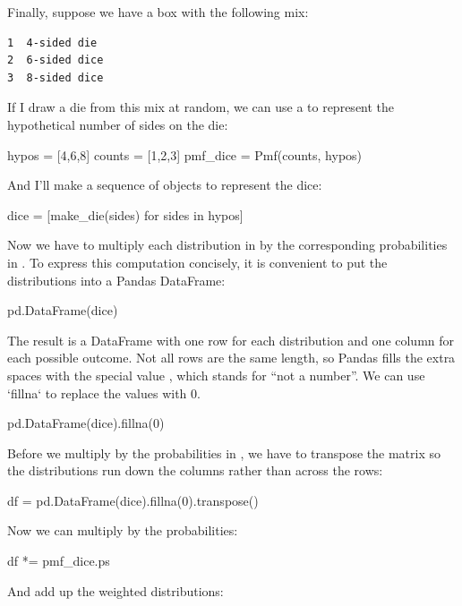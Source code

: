 \documentclass[12pt]{book}
\theoremstyle{exercise}
\begin{document}
Finally, suppose we have a box with the following mix:

\begin{verbatim}
1  4-sided die
2  6-sided dice
3  8-sided dice
\end{verbatim}

If I draw a die from this mix at random, we can use a  to represent the hypothetical number of sides on the die:

\begin{code}
hypos = [4,6,8]
counts = [1,2,3]
pmf_dice = Pmf(counts, hypos)
\end{code}

And I'll make a sequence of  objects to represent the dice:

\begin{code}
dice = [make_die(sides) for sides in hypos]
\end{code}

Now we have to multiply each distribution in  by the corresponding probabilities in .
To express this computation concisely, it is convenient to put the distributions into a Pandas DataFrame:

\begin{code}
pd.DataFrame(dice)
\end{code}

The result is a DataFrame with one row for each distribution and one column for each possible outcome.
Not all rows are the same length, so Pandas fills the extra spaces with the special value , which stands for ``not a number''.
We can use `fillna` to replace the  values with 0.

\begin{code}
pd.DataFrame(dice).fillna(0)
\end{code}

Before we multiply by the probabilities in , we have to transpose the matrix so the distributions run down the columns rather than across the rows:

\begin{code}
df = pd.DataFrame(dice).fillna(0).transpose()
\end{code}

Now we can multiply by the probabilities:

\begin{code}
df *= pmf_dice.ps
\end{code}

And add up the weighted distributions:
\end{document}
